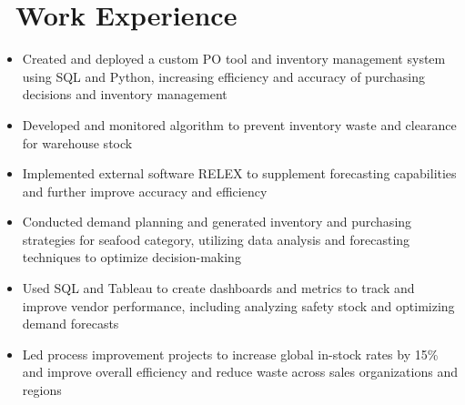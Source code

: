 \documentclass{resume}
\begin{document}
\section{%
\texorpdfstring{\faUsers\ Work
Experience}%
{-{}--Work Experience}}
\begin{itemize}
      \item  Created and deployed a custom PO tool and inventory management
            system
            using SQL and Python, increasing efficiency and accuracy of
            purchasing
            decisions and inventory management
      \item Developed and monitored algorithm to prevent inventory waste and
            clearance for warehouse stock
      \item Implemented external software RELEX to supplement forecasting
            capabilities and further improve accuracy and efficiency
      \item Conducted demand planning and generated inventory and purchasing
            strategies for seafood category, utilizing data analysis and
            forecasting
            techniques to optimize decision-making
      \item Used SQL and Tableau to create dashboards and metrics to track and
            improve vendor performance, including analyzing safety stock and
            optimizing
            demand forecasts
      \item Led process improvement projects to increase global in-stock rates
            by
            15\% and improve overall efficiency and reduce waste across sales
            organizations
            and regions
\end{itemize}
\end{document}

